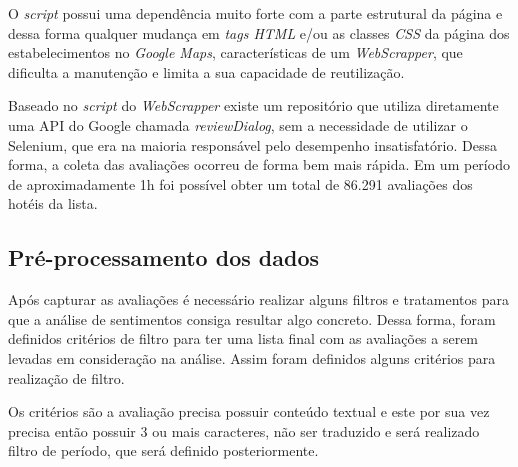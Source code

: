 O \emph{script} possui uma dependência muito forte com a parte estrutural da página e dessa forma qualquer mudança em \emph{tags HTML} e/ou as classes \emph{CSS} da página dos estabelecimentos no \textit{Google Maps}, características de um \emph{WebScrapper}, que dificulta a manutenção e limita a sua capacidade de reutilização.

Baseado no \emph{script} do \emph{WebScrapper} existe um repositório que utiliza diretamente uma API do Google chamada \emph{reviewDialog}, sem a necessidade de utilizar o Selenium, que era na maioria responsável pelo desempenho insatisfatório. Dessa forma, a coleta das avaliações ocorreu de forma bem mais rápida. Em um período de aproximadamente 1h foi possível obter um total de 86.291 avaliações dos hotéis da lista.

\subsection{Pré-processamento dos dados}
\label{cap:metodologia:sec:conjunto_dados:sec:pre_processamento}

Após capturar as avaliações é necessário realizar alguns filtros e tratamentos para que a análise de sentimentos consiga resultar algo concreto. Dessa forma, foram definidos critérios de filtro para ter uma lista final com as avaliações a serem levadas em consideração na análise. Assim foram definidos alguns critérios para realização de filtro.

Os critérios são a avaliação precisa possuir conteúdo textual e este por sua vez precisa então possuir 3 ou mais caracteres, não ser traduzido e será realizado filtro de período, que será definido posteriormente.

